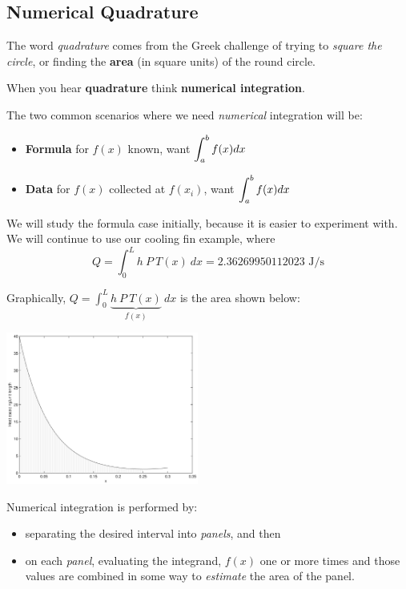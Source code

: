 \newpage

\subsection*{Numerical Quadrature}

The word {\em quadrature} comes from the Greek challenge of trying to
{\em square the circle}, or finding the {\bf area} (in square units)
of the round circle.

When you hear {\bf quadrature} think {\bf numerical integration}.

The two common scenarios where we need {\em numerical} integration will be:
\begin{itemize}
\item {\bf Formula} for $f(x)$ known, want $\displaystyle \int_a^b f(x) dx$
\item {\bf Data} for $f(x)$ collected at $f(x_i)$, want $\displaystyle \int_a^b f(x)
  dx$
\end{itemize}
We will study the formula case initially, because it is easier to
experiment with.  We will continue to use our cooling fin example,
where
$$
Q = \int_0^{L} h ~P ~T(x) ~dx = 2.36269950112023 \mbox{ J/s}
$$

\newpage

Graphically, $\displaystyle Q = \int_0^L \underbrace{h~P~T(x)}_{f(x)}~dx$
is the area shown below:
\begin{center}
\includegraphics[height=5cm]{graphics/notes_06_f_graph_with_area}
\end{center}
Numerical integration is performed by:
\begin{itemize}
\item separating the desired interval into {\em panels}, and then
\item on each {\em panel}, evaluating the integrand, $f(x)$ one or
  more times and those values are combined in some way to {\em estimate}
  the area of the panel.
\end{itemize}

